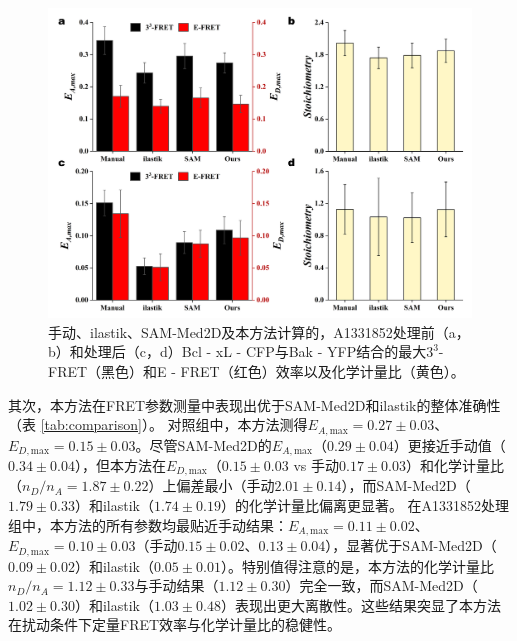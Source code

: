 \begin{figure}[!htb]
  \centering
  \includegraphics[width=1\linewidth]{../figures/4/4_方法对比.png}
  \caption[活细胞中 Bcl-xL-Bak 化学计量比的自动分析方法对比]{手动、ilastik、SAM-Med2D及本方法计算的，A1331852处理前（a，b）和处理后（c，d）Bcl - xL - CFP与Bak - YFP结合的最大$3^3$-FRET（黑色）和E - FRET（红色）效率以及化学计量比（黄色）。}\label{fig3}
\end{figure}

其次，本方法在FRET参数测量中表现出优于SAM-Med2D和ilastik的整体准确性（表 \ref{tab:comparison}）。
对照组中，本方法测得$E_{A,\text{max}}=0.27\pm0.03$、$E_{D,\text{max}}=0.15\pm0.03$。尽管SAM-Med2D的$E_{A,\text{max}}$（$0.29\pm0.04$）更接近手动值（$0.34\pm0.04$），但本方法在$E_{D,\text{max}}$（$0.15\pm0.03$ vs 手动$0.17\pm0.03$）和化学计量比（$n_D/n_A=1.87\pm0.22$）上偏差最小（手动$2.01\pm0.14$），而SAM-Med2D（$1.79\pm0.33$）和ilastik（$1.74\pm0.19$）的化学计量比偏离更显著。
在A1331852处理组中，本方法的所有参数均最贴近手动结果：$E_{A,\text{max}}=0.11\pm0.02$、$E_{D,\text{max}}=0.10\pm0.03$（手动$0.15\pm0.02$、$0.13\pm0.04$），显著优于SAM-Med2D（$0.09\pm0.02$）和ilastik（$0.05\pm0.01$）。特别值得注意的是，本方法的化学计量比$n_D/n_A=1.12\pm0.33$与手动结果（$1.12\pm0.30$）完全一致，而SAM-Med2D（$1.02\pm0.30$）和ilastik（$1.03\pm0.48$）表现出更大离散性。这些结果突显了本方法在扰动条件下定量FRET效率与化学计量比的稳健性。

